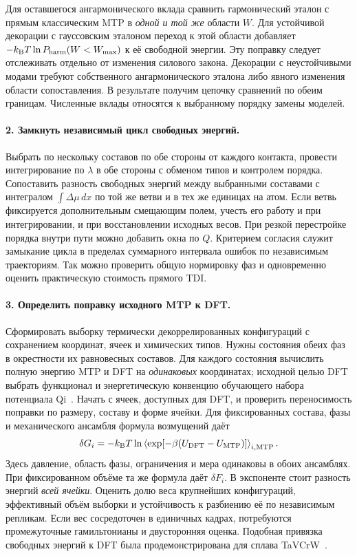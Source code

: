 Для оставшегося ангармонического вклада сравнить гармонический эталон
с прямым классическим MTP в \emph{одной и той же} области \(W\).
Для устойчивой декорации с гауссовским эталоном переход к этой области
добавляет \(-k_{\rm B}T\ln P_{\rm harm}(W<W_{\max})\) к её свободной
энергии. Эту поправку следует отслеживать отдельно от изменения силового
закона. Декорации с неустойчивыми модами требуют собственного
ангармонического эталона либо явного изменения области сопоставления.
В результате получим цепочку сравнений по обеим границам. Численные
вклады относятся к выбранному порядку замены моделей.

\paragraph{2. Замкнуть независимый цикл свободных энергий.}
Выбрать по нескольку составов по обе стороны от каждого контакта, провести
интегрирование по \(\lambda\) в обе стороны с обменом типов и контролем
порядка. Сопоставить разность свободных энергий между выбранными составами
с интегралом \(\int\Delta\mu\,dx\) по той же ветви и в тех же единицах
на атом. Если ветвь фиксируется дополнительным смещающим полем, учесть
его работу и при интегрировании, и при восстановлении исходных весов.
При резкой перестройке порядка внутри пути можно добавить окна по \(Q\).
Критерием согласия служит замыкание цикла в пределах суммарного интервала
ошибок по независимым траекториям. Так можно проверить общую нормировку
фаз и одновременно оценить практическую стоимость прямого TDI.

\paragraph{3. Определить поправку исходного MTP к DFT.}
Сформировать выборку термически декоррелированных конфигураций с сохранением
координат, ячеек и химических типов. Нужны состояния обеих фаз в окрестности
их равновесных составов. Для каждого состояния вычислить полную энергию
MTP и DFT на \emph{одинаковых} координатах; исходной целью DFT выбрать
функционал и энергетическую конвенцию обучающего набора потенциала
Qi~\cite{qi2023}. Начать с ячеек, доступных для DFT, и проверить
переносимость поправки по размеру, составу и форме ячейки. Для фиксированных
состава, фазы и механического ансамбля формула возмущений даёт
\[
 \delta G_i=-k_{\rm B}T
   \ln\left\langle \exp[-\beta(U_{\rm DFT}-U_{\rm MTP})]\right\rangle_{i,{\rm MTP}} .
\]
Здесь давление, область фазы, ограничения и мера одинаковы в обоих
ансамблях. При фиксированном объёме та же формула даёт \(\delta F_i\).
В экспоненте стоит разность энергий \emph{всей ячейки}. Оценить долю
веса крупнейших конфигураций, эффективный объём выборки и устойчивость
к разбиению её по независимым репликам. Если вес сосредоточен в
единичных кадрах, потребуются промежуточные гамильтонианы и
двусторонняя оценка. Подобная привязка свободных энергий к DFT была
продемонстрирована для сплава TaVCrW~\cite{zhu2024}.

